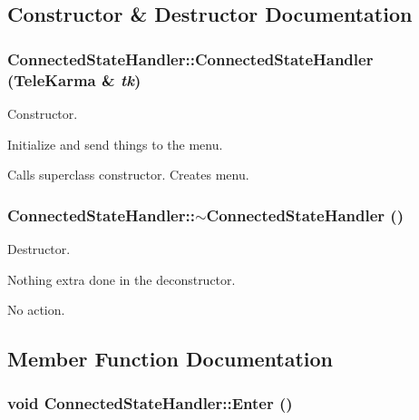 \subsection{Constructor \& Destructor Documentation}
\hypertarget{classConnectedStateHandler_6f13492d7dfdb368376b4c5fb801b95f}{
\subsubsection[{ConnectedStateHandler}]{\setlength{\rightskip}{0pt plus 5cm}ConnectedStateHandler::ConnectedStateHandler ({\bf TeleKarma} \& {\em tk})}}
\label{classConnectedStateHandler_6f13492d7dfdb368376b4c5fb801b95f}


Constructor. 

Initialize and send things to the menu.

Calls superclass constructor. Creates menu.\hypertarget{classConnectedStateHandler_4e2a09e93f69af0a10196a4d3a188d5d}{
\subsubsection[{$\sim$ConnectedStateHandler}]{\setlength{\rightskip}{0pt plus 5cm}ConnectedStateHandler::$\sim$ConnectedStateHandler ()}}
\label{classConnectedStateHandler_4e2a09e93f69af0a10196a4d3a188d5d}


Destructor. 

Nothing extra done in the deconstructor.

No action. 

\subsection{Member Function Documentation}
\hypertarget{classConnectedStateHandler_3eb15025f62e77147d7e20590daabf3e}{
\subsubsection[{Enter}]{\setlength{\rightskip}{0pt plus 5cm}void ConnectedStateHandler::Enter ()}}
\label{classConnectedStateHandler_3eb15025f62e77147d7e20590daabf3e}


